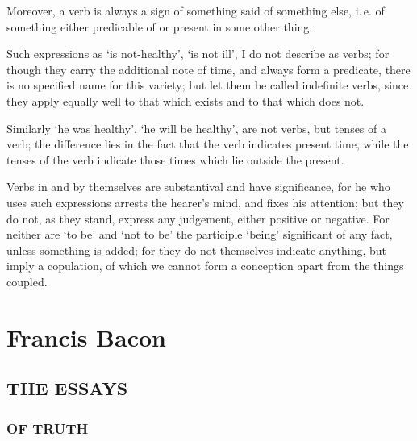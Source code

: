 \documentclass[12pt]{article}
\begin{document}
  Moreover, a verb is always a sign of something said of something
else, i.\,e. of something either predicable of or present in some
other thing.

  Such expressions as `is not-healthy', `is not ill', I do not
describe as verbs; for though they carry the additional note of
time, and always form a predicate, there is no specified name for this
variety; but let them be called indefinite verbs, since they apply
equally well to that which exists and to that which does not.

  Similarly `he was healthy', `he will be healthy', are not verbs, but
tenses of a verb; the difference lies in the fact that the verb
indicates present time, while the tenses of the verb indicate those
times which lie outside the present.

  Verbs in and by themselves are substantival and have significance,
for he who uses such expressions arrests the hearer's mind, and
fixes his attention; but they do not, as they stand, express any
judgement, either positive or negative. For neither are `to be' and
`not to be' the participle `being' significant of any fact, unless
something is added; for they do not themselves indicate anything,
but imply a copulation, of which we cannot form a conception apart
from the things coupled.

\chapter{Francis Bacon}

\section{THE ESSAYS}

\subsection{OF TRUTH}
\end{document}
